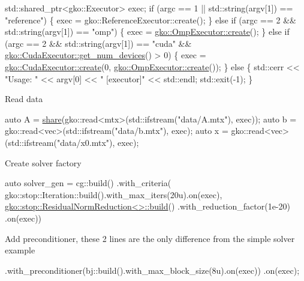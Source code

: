 \begin{DoxyCode}
std::shared\_ptr<gko::Executor> exec;
\textcolor{keywordflow}{if} (argc == 1 || std::string(argv[1]) == \textcolor{stringliteral}{"reference"}) \{
    exec = gko::ReferenceExecutor::create();
\} \textcolor{keywordflow}{else} \textcolor{keywordflow}{if} (argc == 2 && std::string(argv[1]) == \textcolor{stringliteral}{"omp"}) \{
    exec = \hyperlink{classgko_1_1OmpExecutor_a33ca05fdd0fc928ee262fc9425304874}{gko::OmpExecutor::create}();
\} \textcolor{keywordflow}{else} \textcolor{keywordflow}{if} (argc == 2 && std::string(argv[1]) == \textcolor{stringliteral}{"cuda"} &&
           \hyperlink{classgko_1_1CudaExecutor_aef0258494d14de0e56149b920c5173e5}{gko::CudaExecutor::get\_num\_devices}() > 0) \{
    exec = \hyperlink{classgko_1_1CudaExecutor_a2718a92034350650ef406ffdb60db090}{gko::CudaExecutor::create}(0, 
      \hyperlink{classgko_1_1OmpExecutor_a33ca05fdd0fc928ee262fc9425304874}{gko::OmpExecutor::create}());
\} \textcolor{keywordflow}{else} \{
    std::cerr << \textcolor{stringliteral}{"Usage: "} << argv[0] << \textcolor{stringliteral}{" [executor]"} << std::endl;
    std::exit(-1);
\}
\end{DoxyCode}


Read data


\begin{DoxyCode}
\textcolor{keyword}{auto} A = \hyperlink{namespacegko_a3ce296f73db0ff398bdea6009a3a5c58}{share}(gko::read<mtx>(std::ifstream(\textcolor{stringliteral}{"data/A.mtx"}), exec));
\textcolor{keyword}{auto} b = gko::read<vec>(std::ifstream(\textcolor{stringliteral}{"data/b.mtx"}), exec);
\textcolor{keyword}{auto} x = gko::read<vec>(std::ifstream(\textcolor{stringliteral}{"data/x0.mtx"}), exec);
\end{DoxyCode}


Create solver factory


\begin{DoxyCode}
\textcolor{keyword}{auto} solver\_gen =
    cg::build()
        .with\_criteria(
            gko::stop::Iteration::build().with\_max\_iters(20u).on(exec),
            \hyperlink{classgko_1_1stop_1_1ResidualNormReduction}{gko::stop::ResidualNormReduction<>::build}()
                .with\_reduction\_factor(1e-20)
                .on(exec))
\end{DoxyCode}


Add preconditioner, these 2 lines are the only difference from the simple solver example


\begin{DoxyCode}
.with\_preconditioner(bj::build().with\_max\_block\_size(8u).on(exec))
.on(exec);
\end{DoxyCode}


